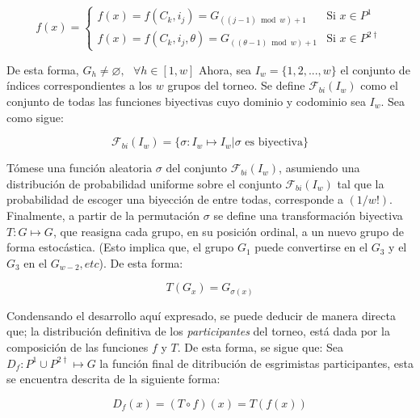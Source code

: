 \documentclass[10pt]{article}
\begin{document}
\begin{equation*}
f(x) = \begin{cases}
    f(x) = f(C_k,i_j) = G_{((j-1) \bmod w)+1} & \text{Si } x \in P^1 \\
    f(x) = f(C_k,i_j,\theta) = G_{((\theta -1) \bmod w)+1} & \text{Si } x \in P^{2\dag} 
\end{cases}
\end{equation*}

\noindent De esta forma, $G_h \neq \varnothing, \text{  } \forall h \in [1,w]$ Ahora, sea $I_w = \{1, 2, ... , w \}$ el conjunto de índices correspondientes %
a los $w$ grupos del torneo. Se define $\mathcal{F}_{bi}(I_w)$ como el conjunto de todas las funciones biyectivas cuyo dominio y codominio sea $I_w$. Sea como sigue:

\begin{equation*}
\mathcal{F}_{bi}(I_w) = \{  \sigma : I_w \mapsto I_w | \sigma \text{ es biyectiva} \}
\end{equation*}

\noindent Tómese una función aleatoria $\sigma$ del conjunto $\mathcal{F}_{bi}(I_w)$, asumiendo una distribución de probabilidad uniforme sobre el conjunto $\mathcal{F}_{bi}(I_w)$ %
tal que la probabilidad de escoger una biyección de entre todas, corresponde a $(1/w!)$. Finalmente, a partir de la permutación $\sigma$ se define una transformación biyectiva %
$T : G \mapsto G$, que reasigna cada grupo, en su posición ordinal, a un nuevo grupo de forma estocástica. (Esto implica que, el grupo $G_1$ puede convertirse en el $G_3$ y el $G_3$ en el $G_{w-2}, etc$). %
De esta forma:

\begin{equation*}
T(G_x) = G_{\sigma(x)}
\end{equation*}

\noindent Condensando el desarrollo aquí expresado, se puede deducir de manera directa que; la distribución definitiva de los \textit{participantes} del torneo, está dada por la composición %
de las funciones $f$ y $T$. De esta forma, se sigue que: Sea $D_f : P^1 \cup P^{2\dag} \mapsto G$ la función final de ditribución de esgrimistas participantes, esta se encuentra descrita de la siguiente forma:

\begin{equation*}
D_f(x) = (T \circ f)(x) = T(f(x))
\end{equation*}
\end{document}
